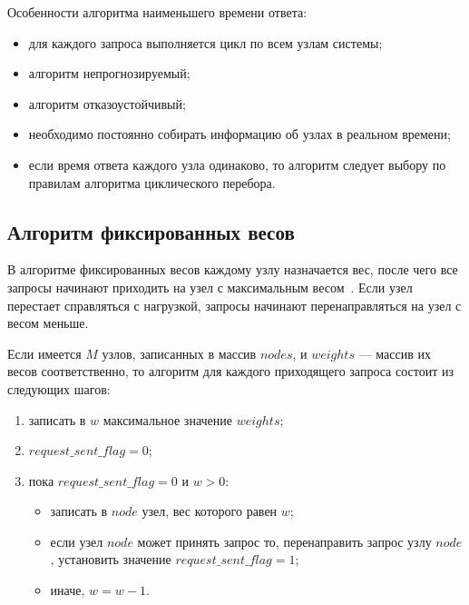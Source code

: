 Особенности алгоритма наименьшего времени ответа:
\begin{itemize}
    \item для каждого запроса выполняется цикл по всем узлам системы;
	\item алгоритм непрогнозируемый; 
	\item алгоритм отказоустойчивый;
	\item необходимо постоянно собирать информацию об узлах в реальном времени;
	\item если время ответа каждого узла одинаково, то алгоритм следует выбору по правилам алгоритма циклического перебора.
\end{itemize}

\subsection{Алгоритм фиксированных весов}

В алгоритме фиксированных весов каждому узлу назначается вес, после чего все запросы начинают приходить на узел с максимальным весом~\cite{kemp}.
Если узел перестает справляться с нагрузкой, запросы начинают перенаправляться на узел с весом меньше.

Если имеется $M$ узлов, записанных в массив $nodes$, и $weights$ --- массив их весов соответственно, то алгоритм для каждого приходящего запроса состоит из следующих шагов:
\begin{enumerate}
	\item записать в $w$ максимальное значение $weights$;
	\item $request\_sent\_flag = 0$;
	\item пока $request\_sent\_flag = 0$ и $w > 0$:
	\begin{itemize}
		\item записать в $node$ узел, вес которого равен $w$;
		\item если узел $node$ может принять запрос то, перенаправить запрос узлу $node$, установить значение $request\_sent\_flag = 1$;
		\item иначе, $w = w - 1$.
	\end{itemize}
\end{enumerate}


